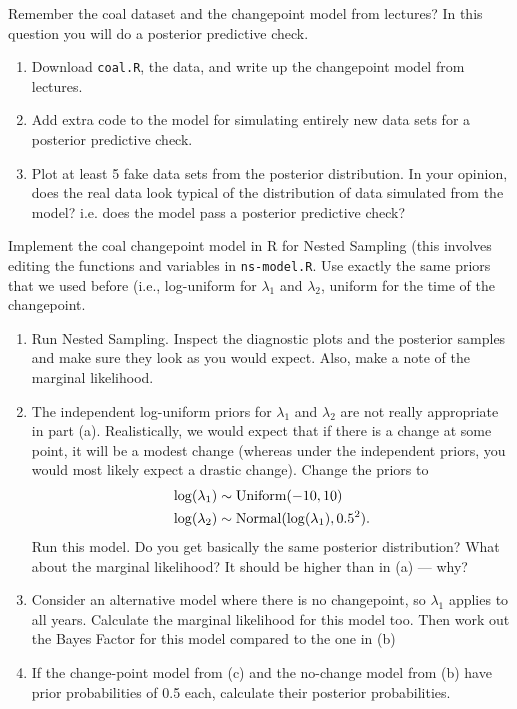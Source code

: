 \documentclass[12pt]{article}
\makeatletter
\def\BackgroundEPS#1#2#3#4{%
    \special{ps: @beginspecial @setspecial initmatrix
                0.9 setgray #2 #3 translate #4 dup scale}
    \special{ps: plotfile #1}
    \special{ps: @endspecial}
}
\makeatother
\begin{document}
\makeband


\begin{Questions}
\item Remember the coal dataset and the changepoint model from lectures?
In this question you will do a posterior predictive check.

\begin{enumerate}
\item Download {\tt coal.R}, the data, and write up the changepoint model
from lectures.
\item Add extra code to the model for simulating entirely new data sets
for a posterior predictive check.
\item Plot at least 5 fake data sets from the posterior distribution. In your
opinion, does the real data look typical of the distribution of data simulated
from the model? i.e. does the model pass a posterior predictive check?
\end{enumerate}


\item Implement the coal changepoint model in R for Nested Sampling (this involves
editing the functions and variables in {\tt ns-model.R}. Use exactly the same
priors that we used before (i.e., log-uniform for $\lambda_1$ and $\lambda_2$,
uniform for the time of the changepoint.

\begin{enumerate}
\item [(a)] Run Nested Sampling. Inspect the diagnostic plots and the posterior
samples and make sure they look as you would expect. Also, make a note of the
marginal likelihood.
\item [(b)] The independent log-uniform priors for $\lambda_1$ and $\lambda_2$
are not really appropriate in part (a).
Realistically, we would expect that if there
is a change at some point, it will be a modest change (whereas under the independent
priors, you would most likely expect a drastic change).
Change the priors to
\begin{align}
\log(\lambda_1) &\sim \textnormal{Uniform}(-10, 10) \\
\log(\lambda_2) &\sim \textnormal{Normal}(\log(\lambda_1), 0.5^2).
\end{align}
Run this model. Do you get basically the same posterior distribution?
What about the marginal likelihood?
It should be higher than in
(a) --- why?
\item [(c)] Consider an alternative model where there is no changepoint,
so $\lambda_1$ applies to all years. Calculate the marginal likelihood for this
model too. Then work out the Bayes Factor for this model compared to the one
in (b)
\item [(d)] If the change-point model from (c) and the no-change model from
(b) have prior probabilities of 0.5 each, calculate their posterior
probabilities.
\end{enumerate}

\end{Questions}
\end{document}
